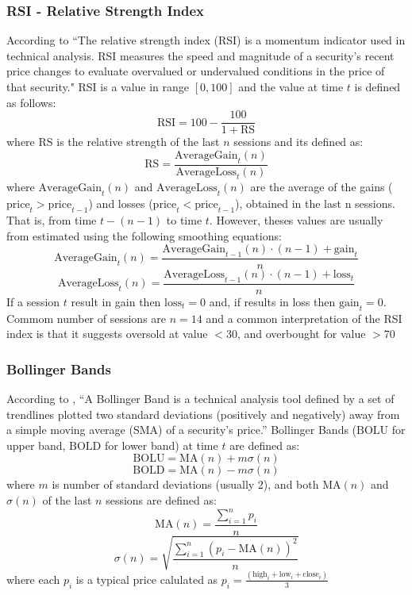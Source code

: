 \documentclass{article}
\begin{document}
\subsubsection*{RSI - Relative Strength Index}
According to \cite{rsi} ``The relative strength index (RSI) is a momentum indicator used in technical analysis. 
RSI measures the speed and magnitude of a security's recent price changes to evaluate overvalued or 
undervalued conditions in the price of that security."
RSI is a value in range $[0, 100]$ and the value at time $t$ is defined as follows:
$$
    \text{RSI} = 100 - \frac{100}{1 + \text{RS}}
$$
where $\text{RS}$ is the relative strength of the last $n$ sessions and its defined as:
$$
    \text{RS} = \frac{\text{AverageGain}_t(n)}{\text{AverageLoss}_t(n)}
$$
where $\text{AverageGain}_t(n)$ and $\text{AverageLoss}_t(n)$ are the average of the gains ($\text{price}_t > \text{price}_{t-1}$) 
and losses ($\text{price}_t < \text{price}_{t-1}$), obtained in the last n sessions. That is, from time $t - (n - 1)$ to time $t$. 
However, theses values are usually from estimated using the following smoothing equations:
$$
    \text{AverageGain}_t(n) = \frac{\text{AverageGain}_{t-1}(n) \cdot (n-1) + \text{gain}_t}{n}
$$ 
$$
    \text{AverageLoss}_t(n) = \frac{\text{AverageLoss}_{t-1}(n) \cdot (n-1) + \text{loss}_t}{n}
$$ 
If a session $t$ result in gain then $\text{loss}_t = 0$ and, if results in loss then $\text{gain}_t = 0$. Commom number of sessions
are $n = 14$ and a common interpretation of the RSI index is that it suggests oversold at value $< 30$, and overbought for value $ > 70$ 

\subsubsection*{Bollinger Bands}
According to \cite{bb}, ``A Bollinger Band is a technical analysis tool defined by a set of trendlines plotted two standard deviations
(positively and negatively) away from a simple moving average (SMA) of a security's price.'' 
Bollinger Bands ($\text{BOLU}$ for upper band, $\text{BOLD}$ for lower band) at time $t$ are defined as:
$$
\text{BOLU} = \text{MA}(n) + m\sigma(n)
$$
$$
\text{BOLD} = \text{MA}(n) - m\sigma(n)
$$
where $m$ is number of standard deviations (usually 2), and both $\text{MA}(n)$ and $\sigma(n)$ of the last $n$ sessions are defined as:
$$
\text{MA}(n) = \frac{\sum_{i = 1}^{n}{p_i}}{n}
$$
$$
\sigma(n) = \sqrt{\frac{\sum_{i = 1}^{n}{(p_i - \text{MA}(n))^2}}{n}}
$$
where each $p_i$ is a typical price calulated as $p_i = \frac{(\text{high}_i + \text{low}_i + \text{close}_i)}{3}$
\end{document}
